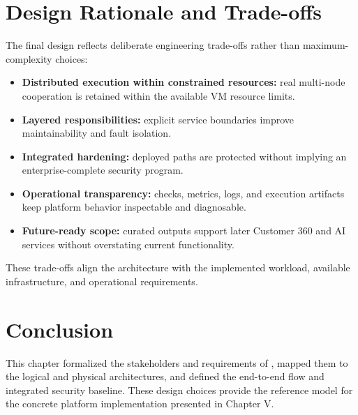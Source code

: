 \section{Design Rationale and Trade-offs}
The final design reflects deliberate engineering trade-offs rather than maximum-complexity choices:
\begin{itemize}[leftmargin=*,itemsep=0.18em,topsep=0.3em]
    \item \textbf{Distributed execution within constrained resources:} real multi-node cooperation is retained within the available VM resource limits.
    \item \textbf{Layered responsibilities:} explicit service boundaries improve maintainability and fault isolation.
    \item \textbf{Integrated hardening:} deployed paths are protected without implying an enterprise-complete security program.
    \item \textbf{Operational transparency:} checks, metrics, logs, and execution artifacts keep platform behavior inspectable and diagnosable.
    \item \textbf{Future-ready scope:} curated outputs support later Customer 360 and AI services without overstating current functionality.
\end{itemize}

These trade-offs align the architecture with the implemented workload, available infrastructure, and operational requirements.

\section{Conclusion}
This chapter formalized the stakeholders and requirements of \projectname{}, mapped them to the logical and physical architectures, and defined the end-to-end flow and integrated security baseline. These design choices provide the reference model for the concrete platform implementation presented in Chapter V.

